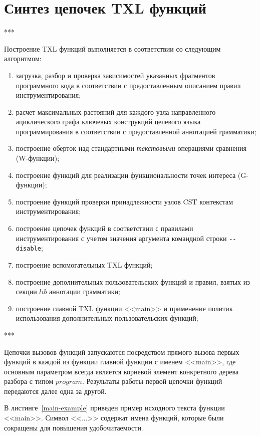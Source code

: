 \section{Синтез цепочек TXL функций}

***

Построение TXL функций выполняется в соответствии со следующим алгоритмом:
\begin{enumerate}[noitemsep]
  \item загрузка, разбор и проверка зависимостей указанных фрагментов программного кода в соответствии с предоставленным описанием правил инструментирования;
  \item расчет максимальных растояний для каждого узла направленного ациклического графа ключевых конструкций целевого языка программирования в соответствии с предоставленной аннотацией грамматики;
  \item построение оберток над стандартными \textit{текстовыми} операциями сравнения (W-функции);
  \item построение функций для реализации функциональности точек интереса (G-функции);
  \item построение функций проверки принадлежности узлов CST контекстам инструментирования;
  \item построение цепочек функций в соответствии с правилами инструментирования с учетом значения аргумента командной строки \lstinline{--disable};
  \item построение вспомогательных TXL функций;
  \item построение дополнительных пользовательских функций и правил, взятых из секции $lib$ аннотации грамматики;
  \item построение главной TXL функции <<main>> и применение политик использования дополнительных пользовательских функций;
\end{enumerate}

***

Цепочки вызовов функций запускаются посредством прямого вызова первых функций в каждой из функции главной функции с именем <<main>>, где  основным параметром всегда является корневой элемент конкретного дерева разбора с типом $program$.
Результаты работы первой цепочки функций передаются далее одна за другой.

В листинге~\ref{main-example} приведен пример исходного текста функции <<main>>.
Символ <<...>> содержат имена функций, которые были сокращены для повышения удобочитаемости.


